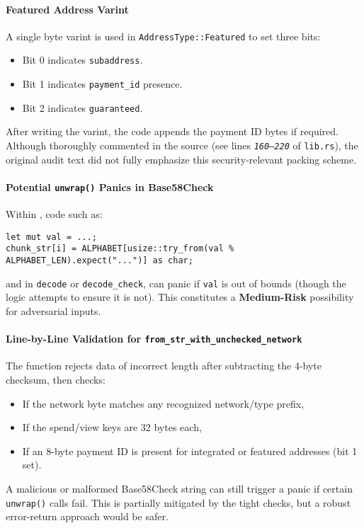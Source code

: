 \documentclass[12pt,a4paper]{article}
\begin{document}
\paragraph{Featured Address Varint}
A single byte varint is used in \texttt{AddressType::Featured} to set three bits: 
\begin{itemize}
    \item Bit 0 indicates \texttt{subaddress}.
    \item Bit 1 indicates \texttt{payment\_id} presence.
    \item Bit 2 indicates \texttt{guaranteed}.
\end{itemize}
After writing the varint, the code appends the payment ID bytes if required. Although thoroughly commented in the source (see lines \textit{\texttt{160--220}} of \texttt{lib.rs}), the original audit text did not fully emphasize this security‐relevant packing scheme.

\paragraph{Potential \texttt{unwrap()} Panics in Base58Check}
Within , code such as:
\begin{verbatim}
let mut val = ...;
chunk_str[i] = ALPHABET[usize::try_from(val % ALPHABET_LEN).expect("...")] as char;
\end{verbatim}
and in \texttt{decode} or \texttt{decode\_check}, can panic if \texttt{val} is out of bounds (though the logic attempts to ensure it is not). This constitutes a \textbf{Medium-Risk} possibility for adversarial inputs.

\paragraph{Line-by-Line Validation for \texttt{from\_str\_with\_unchecked\_network}}
The function rejects data of incorrect length after subtracting the 4-byte checksum, then checks:
\begin{itemize}
  \item If the network byte matches any recognized network/type prefix,
  \item If the spend/view keys are 32 bytes each,
  \item If an 8-byte payment ID is present for integrated or featured addresses (bit 1 set).
\end{itemize}
A malicious or malformed Base58Check string can still trigger a panic if certain \texttt{unwrap()} calls fail. This is partially mitigated by the tight checks, but a robust error-return approach would be safer.
\end{document}
